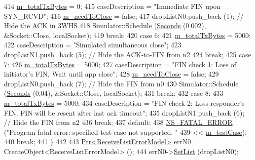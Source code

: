 \begin{DoxyCode}
414       \hyperlink{classNs3TcpStateTestCase_a360461d408b9c3b88e025e9fb760a92c}{m\_totalTxBytes} = 0;
415       caseDescription = \textcolor{stringliteral}{"Immediate FIN upon SYN\_RCVD"};
416       \hyperlink{classNs3TcpStateTestCase_adcda588067de3d43d150c5358b883455}{m\_needToClose} = \textcolor{keyword}{false};
417       dropListN0.push\_back (1); \textcolor{comment}{// Hide the ACK in 3WHS}
418       Simulator::Schedule (\hyperlink{group__timecivil_ga33c34b816f8ff6628e33d5c8e9713b9e}{Seconds} (0.002), &Socket::Close, localSocket);
419       \textcolor{keywordflow}{break};
420     \textcolor{keywordflow}{case} 6:
421       \hyperlink{classNs3TcpStateTestCase_a360461d408b9c3b88e025e9fb760a92c}{m\_totalTxBytes} = 5000;
422       caseDescription = \textcolor{stringliteral}{"Simulated simultaneous close"};
423       dropListN1.push\_back (5); \textcolor{comment}{// Hide the ACK-to-FIN from n2}
424       \textcolor{keywordflow}{break};
425     \textcolor{keywordflow}{case} 7:
426       \hyperlink{classNs3TcpStateTestCase_a360461d408b9c3b88e025e9fb760a92c}{m\_totalTxBytes} = 5000;
427       caseDescription = \textcolor{stringliteral}{"FIN check 1: Loss of initiator's FIN. Wait until app close"};
428       \hyperlink{classNs3TcpStateTestCase_adcda588067de3d43d150c5358b883455}{m\_needToClose} = \textcolor{keyword}{false};
429       dropListN0.push\_back (7); \textcolor{comment}{// Hide the FIN from n0}
430       Simulator::Schedule (\hyperlink{group__timecivil_ga33c34b816f8ff6628e33d5c8e9713b9e}{Seconds} (0.04), &Socket::Close, localSocket);
431       \textcolor{keywordflow}{break};
432     \textcolor{keywordflow}{case} 8:
433       \hyperlink{classNs3TcpStateTestCase_a360461d408b9c3b88e025e9fb760a92c}{m\_totalTxBytes} = 5000;
434       caseDescription = \textcolor{stringliteral}{"FIN check 2: Loss responder's FIN. FIN will be resent after last ack timeout"};
435       dropListN1.push\_back (6); \textcolor{comment}{// Hide the FIN from n2}
436       \textcolor{keywordflow}{break};
437     \textcolor{keywordflow}{default}:
438       \hyperlink{group__fatal_ga5131d5e3f75d7d4cbfd706ac456fdc85}{NS\_FATAL\_ERROR} (\textcolor{stringliteral}{"Program fatal error: specified test case not supported: "}
439                       << \hyperlink{classNs3TcpStateTestCase_af1ec330b601d913a2fcafce1a4bd799e}{m\_testCase});
440       \textcolor{keywordflow}{break};
441     \}
442 
443   \hyperlink{classns3_1_1Ptr}{Ptr<ReceiveListErrorModel>} errN0 = CreateObject<ReceiveListErrorModel> ();
444   errN0->\hyperlink{classns3_1_1ReceiveListErrorModel_ae710ec96d43c47bedb5d941351a4d809}{SetList} (dropListN0);

\end{DoxyCode}
